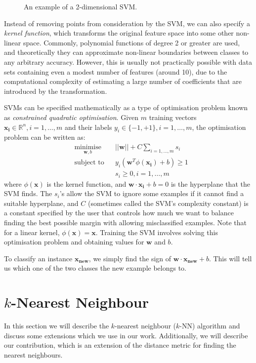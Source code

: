 \begin{figure}[h]
\caption{An example of a 2-dimensional SVM.}
\label{fig:svm}
\centering
\end{figure}

Instead of removing points from consideration by the SVM, we can also specify
a \textit{kernel function}, which transforms the original feature space into
some other non-linear space. Commonly, polynomial functions of degree 2 or
greater are used, and theoretically they can approximate non-linear boundaries
between classes to any arbitrary accuracy. However, this is usually not
practically possible with data sets containing even a modest number of features
(around 10), due to the computational complexity of estimating a large number
of coefficients that are introduced by the transformation.

SVMs can be specified mathematically as a type of optimisation problem known
as \textit{constrained quadratic optimisation}. Given $m$ training vectors
$\mathbf{x_i} \in \mathbb{R}^n, i=1,\ldots,m$ and their labels
$y_i \in \{-1,+1\}, i=1,\ldots,m$, the optimisation problem can be written as:
\begin{equation*}
\begin{aligned}
& \underset{\mathbf{w},b}{\mathrm{minimise}}
  && ||\mathbf{w}|| + C\sum_{i=1,\ldots,m} s_i \\
& \text{subject to}
  && y_i(\mathbf{w}^T\phi(\mathbf{x_i})+b) \geq 1 \\
& && s_i \geq 0, i = 1,\ldots,m
\end{aligned}
\end{equation*}
where $\phi(\mathbf{x})$ is the kernel function, and
$\mathbf{w}\cdot\mathbf{x_i} + b = 0$ is the hyperplane that the SVM finds.
The $s_i$'s allow the SVM to ignore some examples if it cannot find a suitable
hyperplane, and $C$ (sometimes called the SVM's complexity constant) is a
constant specified by the user that controls how much we want to balance
finding the best possible margin with allowing misclassified examples.
Note that for a linear kernel, $\phi(\mathbf{x}) = \mathbf{x}$. Training the
SVM involves solving this optimisation problem and obtaining values for
$\mathbf{w}$ and $b$.

To classify an instance $\mathbf{x_{new}}$, we simply find the sign of
$\mathbf{w}\cdot\mathbf{x_{new}}+b$. This will tell us which one of the
two classes the new example belongs to.

\section{$k$-Nearest Neighbour}
In this section we will describe the $k$-nearest neighbour ($k$-NN) algorithm
and discuss some extensions which we use in our work. Additionally, we will
describe our contribution, which is an extension of the distance metric for
finding the nearest neighbours.

